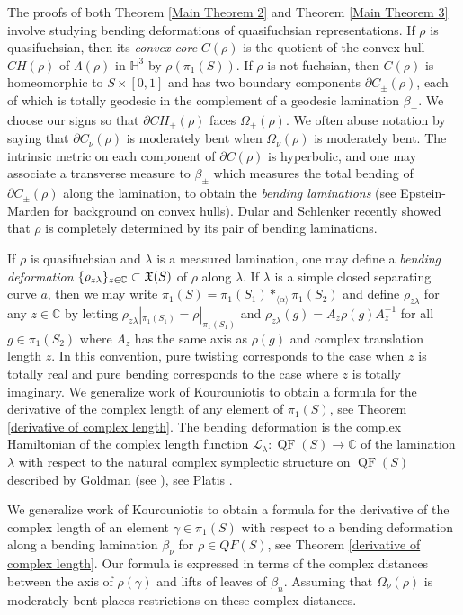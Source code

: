 \documentclass{amsart}
\theoremstyle{plain}
\theoremstyle{definition}
\theoremstyle{remark}
\newcommand{\QF}{\operatorname{QF}}
\newcommand{\C}{\mathbb C}
\newcommand{\<}{\left <}
\renewcommand{\>}{\right >}
\renewcommand{\C}{\mathbb C}
\begin{document}
The proofs of both Theorem \ref{Main Theorem 2} and Theorem \ref{Main Theorem 3} involve studying bending deformations of
quasifuchsian representations.
If $\rho$ is quasifuchsian, then its {\em convex core} $C(\rho)$ is the quotient of the convex hull $CH(\rho)$ of $\Lambda(\rho)$ in $\mathbb H^3$ by
$\rho(\pi_1(S))$. If $\rho$ is not fuchsian, then $C(\rho)$ is homeomorphic to $S\times [0,1]$ and
has two boundary components $\partial C_\pm(\rho)$,
each of which is totally geodesic in the complement of a geodesic lamination $\beta_\pm$. 
We choose our signs so that $\partial CH_+(\rho)$ faces $\Omega_+(\rho)$. We often abuse notation by saying that $\partial  C_\nu(\rho)$
is moderately bent when $\Omega_\nu(\rho)$ is moderately bent.
The intrinsic metric on each component of $\partial C(\rho)$ is hyperbolic, and one may associate  a transverse measure
to $\beta_\pm$ which measures the total bending  of $\partial C_\pm(\rho)$ along the lamination, to obtain the 
{\em bending laminations} (see Epstein-Marden \cite{EM} for background on convex hulls). Dular and Schlenker \cite{dular-schlenker} 
recently showed that $\rho$ is completely determined by
its pair of bending laminations.

If $\rho$ is quasifuchsian and $\lambda$ is a measured lamination, one may define a {\em bending deformation}
$\{\rho_{z\lambda}\}_{z\in\C}\subset \frak X(S)$ of $\rho$ along $\lambda$.
If $\lambda$ is a simple closed separating curve $a$, then we may write
$\pi_1(S)=\pi_1(S_1)*_{\langle \alpha\rangle}\pi_1(S_2)$ and define $\rho_{z\lambda}$ for any $z\in\C$ by letting
$\rho_{z\lambda}|_{\pi_1(S_1)}=\rho|_{\pi_1(S_1)}$ and $\rho_{z\lambda}(g)=A_z\rho(g)A_z^{-1}$ for all $g\in\pi_1(S_2)$ 
where $A_z$ has the same axis as $\rho(g)$ and complex translation length $z$.
In this convention, pure twisting corresponds to the case when $z$ is totally real and pure bending corresponds 
to the case where $z$ is totally imaginary.
We  generalize work of Kourouniotis \cite{kouron,kouron-cont} to obtain a formula for
the derivative of the complex length of any element of $\pi_1(S)$, see Theorem \ref{derivative of complex length}. 
The bending deformation is the complex Hamiltonian of the complex length function $\mathcal L_\lambda:\QF(S) \rightarrow \C$ 
of the lamination $\lambda$ with respect to the natural complex symplectic structure on $\QF(S)$ described 
by Goldman (see \cite{goldman-qc-symp,goldman-symplectic}), see Platis \cite{platis}.

We  generalize work of Kourouniotis \cite{kouron,kouron-cont} to obtain a formula for
the derivative of the complex length of an element $\gamma\in\pi_1(S)$ with respect to a bending deformation
along a bending lamination $\beta_\nu$ for $\rho\in QF(S)$, see Theorem \ref{derivative of complex length}. 
Our formula is expressed in terms of the complex distances between the axis of $\rho(\gamma)$ and lifts
of leaves of $\beta_n$. Assuming that $\Omega_\nu(\rho)$ is moderately bent places restrictions
on these complex distances.
\end{document}
